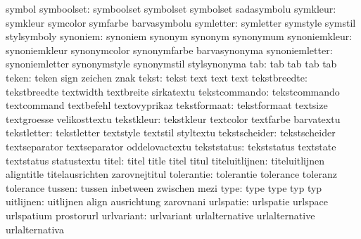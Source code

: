                        symbol
          symboolset:  symboolset           symbolset            symbolset
                       sadasymbolu
            symkleur:  symkleur             symcolor             symfarbe
                       barvasymbolu
           symletter:  symletter            symstyle             symstil
                       stylsymboly
            synoniem:  synoniem             synonym              synonym
                       synonymum
       synoniemkleur:  synoniemkleur        synonymcolor         synonymfarbe
                       barvasynonyma
      synoniemletter:  synoniemletter       synonymstyle         synonymstil        stylsynonyma
                 tab:  tab                  tab                  tab
                       tab
               teken:  teken                sign                 zeichen
                       znak
               tekst:  tekst                text                 text
                       text
        tekstbreedte:  tekstbreedte         textwidth            textbreite
                       sirkatextu
       tekstcommando:  tekstcommando        textcommand          textbefehl
                       textovyprikaz
        tekstformaat:  tekstformaat         textsize             textgroesse
                       velikosttextu
          tekstkleur:  tekstkleur           textcolor            textfarbe
                       barvatextu
         tekstletter:  tekstletter          textstyle            textstil
                       styltextu
       tekstscheider:  tekstscheider        textseparator        textseparator
                       oddelovactextu
         tekststatus:  tekststatus          textstate            textstatus
                       statustextu
               titel:  titel                title                titel
                       titul
      titeluitlijnen:  titeluitlijnen       aligntitle           titelausrichten
                       zarovnejtitul
          tolerantie:  tolerantie           tolerance            toleranz
                       tolerance
              tussen:  tussen               inbetween            zwischen
                       mezi
                type:  type                 type                 typ
                       typ
           uitlijnen:  uitlijnen            align                ausrichtung
                       zarovnani
           urlspatie:  urlspatie            urlspace             urlspatium
                       prostorurl
          urlvariant:  urlvariant           urlalternative       urlalternative
                       urlalternativa
